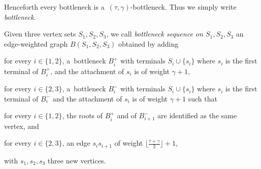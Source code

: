 \documentclass[a4paper,UKenglish,cleveref,hyperref,autoref]{lipics-v2021}
\begin{document}
Henceforth every bottleneck is a~$(\tau, \gamma)$-bottleneck.
Thus we simply write \emph{bottleneck}.

\begin{definition}\label{def:bottleneck-seq}
  Given three vertex sets $S_1, S_2, S_3$, we call \emph{bottleneck sequence on $S_1, S_2, S_3$} an edge-weighted graph $B(S_1, S_2, S_3)$ obtained by adding
  \begin{compactenum}
  \item for every $i \in \{1,2\}$, a~bottleneck $B_i^+$ with terminals $S_i \cup \{s_i\}$ where $s_i$ is the first terminal of $B_i^+$, and the attachment of $s_i$ is of weight $\gamma + 1$, 
  \item for every $i \in \{2,3\}$, a~bottleneck $B_i^-$ with terminals $S_i \cup \{s_i\}$ where $s_i$ is the first terminal of $B_i^-$ and the attachment of $s_i$ is of weight $\gamma + 1$ such that
  \item for every $i \in \{1,2\}$, the roots of $B_i^+$ and of $B_{i+1}^-$ are identified as the same vertex, and
  \item for every $i \in \{2,3\}$, an edge $s_is_{i+1}$ of weight $\lfloor \frac{\tau + \gamma}{2} \rfloor + 1$, 
  \end{compactenum}
  with $s_1, s_2, s_3$ three new vertices.
\end{definition}
\end{document}
